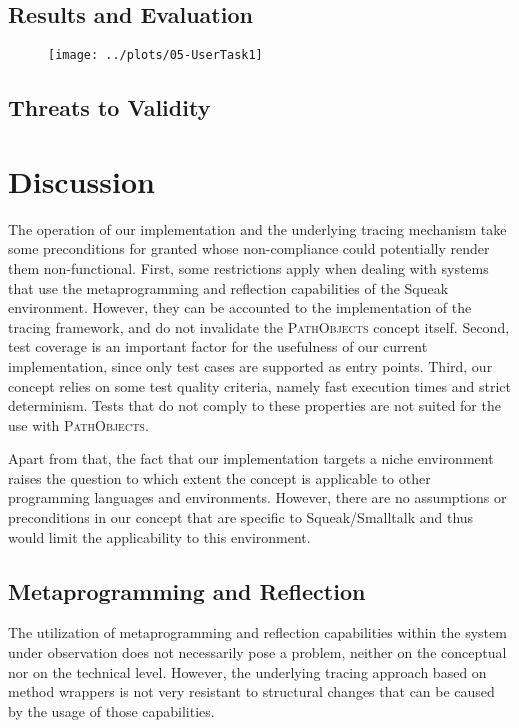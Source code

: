 \subsection{Results and Evaluation}

\begin{figure}[tb]
	\centering

	\texttt{[image: ../plots/05-UserTask1]}
	\caption[]{}
	\label{fig:ADiscussionStudyResultsTask1}
	
\end{figure}

\subsection{Threats to Validity}

\clearpage
\section{Discussion}
\label{s:DiscussionLimitations}
The operation of our implementation and the underlying tracing mechanism take some preconditions for granted whose non-compliance could potentially render them non-functional.
First, some restrictions apply when dealing with systems that use the metaprogramming and reflection capabilities of the Squeak environment.
However, they can be accounted to the implementation of the tracing framework, and do not invalidate the \textsc{PathObjects} concept itself.
Second, test coverage is an important factor for the usefulness of our current implementation, since only test cases are supported as entry points. 
Third, our concept relies on some test quality criteria, namely fast execution times and strict determinism.
Tests that do not comply to these properties are not suited for the use with \textsc{PathObjects}.

Apart from that, the fact that our implementation targets a niche environment raises the question to which extent the concept is applicable to other programming languages and environments.
However, there are no assumptions or preconditions in our concept that are specific to  Squeak/Smalltalk and thus would limit the applicability to this environment.

\subsection{Metaprogramming and Reflection}
\label{ss:DiscussionLimitationsMeta}
The utilization of metaprogramming and reflection capabilities within the system under observation does not necessarily pose a problem, neither on the conceptual nor on the technical level.
However, the underlying tracing approach based on method wrappers is not very resistant to structural changes that can be caused by the usage of those capabilities.

